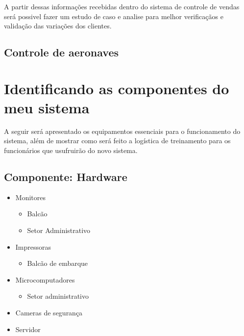 A partir dessas informações recebidas dentro do 
sistema de controle de vendas será possivel fazer um 
estudo de caso e analise para melhor verificaçãos e validação
das variações dos clientes.

\subsection{Controle de aeronaves}


\section{Identificando as componentes do meu sistema}
A seguir será apresentado os equipamentos essenciais para o funcionamento do sistema, além de
mostrar como será feito a logística de treinamento para os funcionários que usufruirão do novo
sistema.

\subsection{Componente: Hardware}
\begin{itemize}
       \item Monitores
             \begin{itemize}
                    \item Balcão
                    \item Setor Administrativo
             \end{itemize}
             
       \item Impressoras
             \begin{itemize}
                    \item Balcão de embarque
             \end{itemize}
       \item Microcomputadores
             \begin{itemize}
                    \item Setor administrativo
             \end{itemize}
       \item Cameras de segurança
       \item Servidor
\end{itemize}

